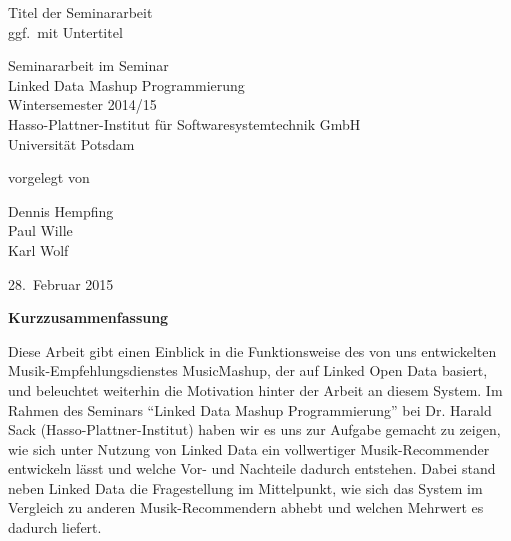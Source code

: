 \documentclass[11pt, a4paper]{article}
\begin{document}
          

\begin{titlepage}
  \begin{center} 
    \mbox{}
    \vspace{1cm}
    
    {\huge Titel der Seminararbeit \\[1em] {\LARGE ggf.~mit Untertitel}}  
        
    \vspace{5cm}
    
    Seminararbeit im Seminar \\[1em]
    {\large \sc Linked Data Mashup Programmierung} \\[1em]
    Wintersemester 2014/15 \\[1em]
    Hasso-Plattner-Institut für Softwaresystemtechnik GmbH \\[1em]
    Universität Potsdam
    
    \vspace{4cm}
    
		vorgelegt von
		
    \vspace{1em}
    
        {\Large Dennis Hempfing} \\
		{\Large Paul Wille} \\
		{\Large Karl Wolf}
		
    \vspace{4em}
    
    28.~Februar 2015
  \end{center}
\end{titlepage}


\setcounter{page}{1}

\begin{center}
{\bf Kurzzusammenfassung} 
\end{center}

\noindent
Diese Arbeit gibt einen Einblick in die Funktionsweise des von uns entwickelten Musik-Empfehlungsdienstes MusicMashup, der auf Linked Open Data basiert, und beleuchtet weiterhin die Motivation hinter der Arbeit an diesem System. Im Rahmen des Seminars “Linked Data Mashup Programmierung” bei Dr. Harald Sack (Hasso-Plattner-Institut) haben wir es uns zur Aufgabe gemacht zu zeigen, wie sich unter Nutzung von Linked Data ein vollwertiger Musik-Recommender entwickeln lässt und welche Vor- und Nachteile dadurch entstehen.
Dabei stand neben Linked Data die Fragestellung im Mittelpunkt, wie sich das System im Vergleich zu anderen Musik-Recommendern abhebt und welchen Mehrwert es dadurch liefert.
\end{document}
